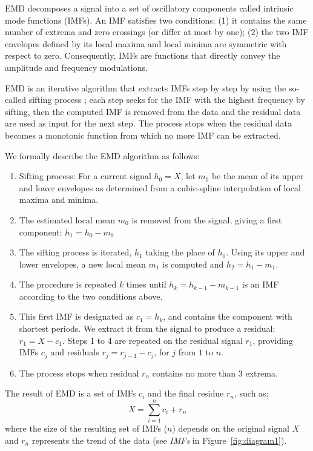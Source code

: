 EMD decomposes a signal into a set of oscillatory components called intrinsic mode functions (IMFs). 
An IMF satisfies two conditions: (1) it contains the same number of extrema and zero crossings (or differ at most by one); (2) the two 
IMF envelopes defined by its local maxima and local minima are symmetric with respect to zero.  Consequently, 
 IMFs are functions that directly convey the amplitude and frequency modulations.

EMD is an iterative algorithm that extracts IMFs step by step by using the so-called sifting process \cite{huang:emd1998}; each step seeks for the IMF with the highest frequency by sifting, then the computed IMF is removed from the data and the residual data are used as input for the 
next step.
The process stops when the residual data becomes a monotonic function from which no more IMF can be extracted.

We formally describe the EMD algorithm as follows: 
\begin{enumerate}
\item Sifting process: For a current signal $h_0=X$, let $m_0$ be the mean of its upper and lower envelopes as determined from a cubic-spline interpolation of local maxima and minima.
\item The estimated local mean $m_0$ is removed from the signal, giving a first component: $h_1 = h_0-m_0$
\item The sifting process is iterated, $h_1$ taking the place of $h_0$. Using its upper and lower envelopes, a new local mean $m_1$ is computed and $h_2 = h_1-m_1$.
\item The procedure is repeated $k$ times until $h_k=h_{k-1}-m_{k-1}$ is an IMF according to the two conditions above.
\item This first IMF is designated as $c_1 = h_k$, and contains the component with shortest periods. We extract it from the signal to produce a residual: $r_1 = X - c_1$.  Steps 1 to 4 are repeated on the residual signal $r_1$, providing IMFs $c_j$ and residuals $r_j  = r_{j-1}-c_j$, for $j$ from $1$ to $n$.
\item The process stops when residual $r_n$ contains no more than 3 extrema.
\end{enumerate}

The result of EMD is a set of IMFs $c_i$ and the final residue $r_n$, such as: \[X=\sum^{n}_{i=1}c_i+r_n\]
where the size of the resulting set of IMFs ($n$) depends on the original signal $X$ and $r_n$ represents the trend of 
the data (see \emph{IMFs} in Figure~\ref{fig:diagram1}).

